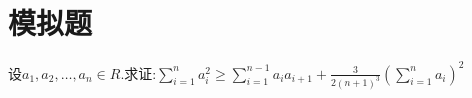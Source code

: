 \documentclass[question]{article}
\title{}
\author{}
\date{}
\begin{document}
\maketitle
\section{模拟题}{
设$a_1,a_2,…,a_n \in R.$求证:$\sum\limits_{i=1}^n{a_i^2}\geq \sum\limits_{i=1}^{n-1}a_{i}a_{i+1}+\frac{3}{2(n+1)^3}(\sum\limits_{i=1}^n{a_i})^2$\\
\iffalse
配方，得到$a_1^2+\sum\limits_{i=1}^{n-1}(a_i-a_{i+1})^+a_n^2 \geq \frac{3}{2(n+1)^3}(\sum\limits_{i=1}^n{a_i})^2 $\\
 \qquad 由Cauchy不等式得\\$(n^2+(n-1)^2+(n-2)^2…1^2+0^2)(a_1^2+(a_1-a_2)^2+(a_2-a_3)^2+…+a_n^2) \\ \geq (na_1^2-(n-1)a_1^2+(n-1)a_2^2-(n-2)a_2^2+(n-2)a_3^2-(n-3)a_3^2+…+a_n^2)^2$\\
然后yy即可.
\fi
}
\end{document}
